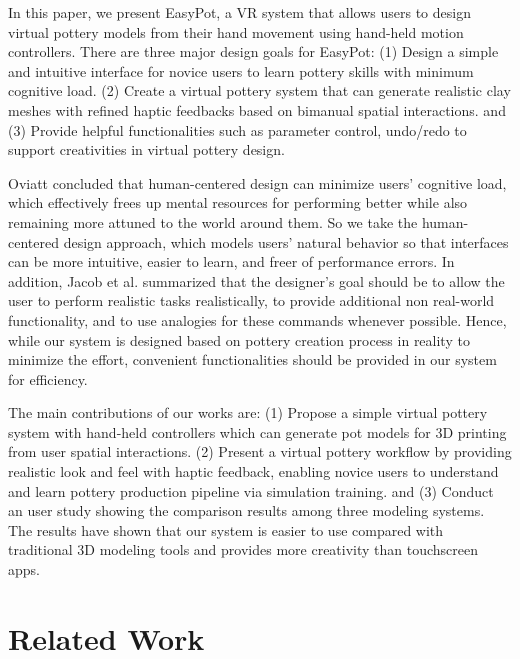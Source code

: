 \documentclass{svjour3}                     %
\begin{document}
In this paper, we present EasyPot, a VR system that allows users to design virtual pottery models from their hand movement using hand-held motion controllers. There are three major design goals for EasyPot:
(1) Design a simple and intuitive interface for novice users to learn pottery skills with minimum cognitive load.
(2) Create a virtual pottery system that can generate realistic clay meshes with refined haptic feedbacks based on bimanual spatial interactions.
and (3) Provide helpful functionalities such as parameter control, undo/redo to support creativities in virtual pottery design.

Oviatt \cite{oviatt2006human} concluded that human-centered design can minimize users’ cognitive load, which effectively frees up mental resources for performing better while also remaining more attuned to the world around them.
So we take the human-centered design approach, which models users’ natural behavior so that interfaces can be more intuitive, easier to learn, and freer of performance errors.
In addition, Jacob et al. \cite{Jacob2008Reality} summarized that the designer's goal should be to allow the user to perform realistic tasks realistically, to provide additional non real-world functionality, and to use analogies for these commands whenever possible.
Hence, while our system is designed based on pottery creation process in reality to minimize the effort, convenient functionalities should be provided in our system for efficiency.

The main contributions of our works are:
%
(1) Propose a simple virtual pottery system with hand-held controllers which can generate pot models for 3D printing from user spatial interactions.
%
(2) Present a virtual pottery workflow by providing realistic look and feel with haptic feedback, enabling novice users to understand and learn pottery production pipeline via simulation training.
%
and (3) Conduct an user study showing the comparison results among three modeling systems. The results have shown that our system is easier to use compared with traditional 3D modeling tools and provides more creativity than touchscreen apps.


\section{Related Work}
\label{sec:2}
\end{document}
